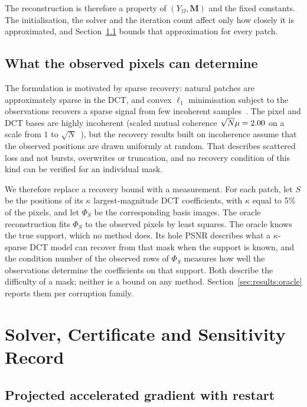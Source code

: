 \documentclass[final,3p]{elsarticle}
\begin{document}
The reconstruction is therefore a property of $(Y_{\Omega}, \mathbf{M})$ and the fixed constants. The initialisation, the solver and the iteration count affect only how closely it is approximated, and Section~\ref{sec:framework:solver} bounds that approximation for every patch.

\subsection{What the observed pixels can determine}
\label{sec:problem:oracle}

The formulation is motivated by sparse recovery: natural patches are approximately sparse in the DCT, and convex $\ell_{1}$ minimisation subject to the observations recovers a sparse signal from few incoherent samples~\cite{candes2006robust,donoho2006compressed}. The pixel and DCT bases are highly incoherent (scaled mutual coherence $\sqrt{N}\mu = 2.00$ on a scale from $1$ to $\sqrt{N}$~\cite{candes2007sparsity}), but the recovery results built on incoherence assume that the observed positions are drawn uniformly at random. That describes scattered loss and not bursts, overwrites or truncation, and no recovery condition of this kind can be verified for an individual mask.

We therefore replace a recovery bound with a measurement. For each patch, let $S$ be the positions of its $\kappa$ largest-magnitude DCT coefficients, with $\kappa$ equal to 5\% of the pixels, and let $\Phi_{S}$ be the corresponding basis images. The oracle reconstruction fits $\Phi_{S}$ to the observed pixels by least squares. The oracle knows the true support, which no method does. Its hole PSNR describes what a $\kappa$-sparse DCT model can recover from that mask when the support is known, and the condition number of the observed rows of $\Phi_{S}$ measures how well the observations determine the coefficients on that support. Both describe the difficulty of a mask; neither is a bound on any method. Section~\ref{sec:results:oracle} reports them per corruption family.

\section{Solver, Certificate and Sensitivity Record}
\label{sec:framework}

\subsection{Projected accelerated gradient with restart}
\label{sec:framework:solver}
\end{document}

